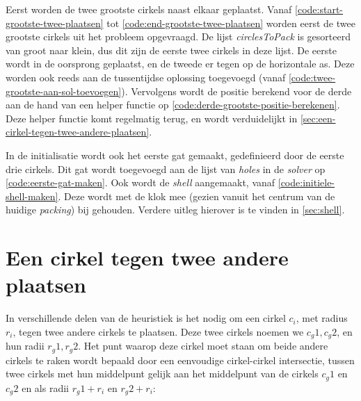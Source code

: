 \documentclass[12pt,a4paper,oneside]{book}
\begin{document}
Eerst worden de twee grootste cirkels naast elkaar geplaatst.
Vanaf \autoref{code:start-grootste-twee-plaatsen} tot \autoref{code:end-grootste-twee-plaatsen} worden eerst de twee grootste cirkels uit het probleem opgevraagd.
De lijst \textit{circlesToPack} is gesorteerd van groot naar klein, dus dit zijn de eerste twee cirkels in deze lijst.
De eerste wordt in de oorsprong geplaatst, en de tweede er tegen op de horizontale as.
Deze worden ook reeds aan de tussentijdse oplossing toegevoegd (vanaf \autoref{code:twee-grootste-aan-sol-toevoegen}).
Vervolgens wordt de positie berekend voor de derde aan de hand van een helper functie op \autoref{code:derde-grootste-positie-berekenen}.
Deze helper functie komt regelmatig terug, en wordt verduidelijkt in \autoref{sec:een-cirkel-tegen-twee-andere-plaatsen}.

In de initialisatie wordt ook het eerste gat gemaakt, gedefinieerd door de eerste drie cirkels.
Dit gat wordt toegevoegd aan de lijst van \textit{holes} in de \textit{solver} op \autoref{code:eerste-gat-maken}.
Ook wordt de \textit{shell} aangemaakt, vanaf \autoref{code:initiele-shell-maken}.
Deze wordt met de klok mee (gezien vanuit het centrum van de huidige \textit{packing}) bij gehouden.
Verdere uitleg hierover is te vinden in \autoref{sec:shell}.

\section{Een cirkel tegen twee andere plaatsen} \label{sec:een-cirkel-tegen-twee-andere-plaatsen}

In verschillende delen van de heuristiek is het nodig om een cirkel $c_i$, met radius $r_i$, tegen twee andere cirkels te plaatsen.
Deze twee cirkels noemen we $c_g1, c_g2$, en hun radii $r_g1, r_g2$.
Het punt waarop deze cirkel moet staan om beide andere cirkels te raken wordt bepaald door een eenvoudige cirkel-cirkel intersectie, tussen twee cirkels met hun middelpunt gelijk aan het middelpunt van de cirkels $c_g1$ en $c_g2$ en als radii $r_g1+r_i$ en $r_g2+r_i$:
\end{document}
